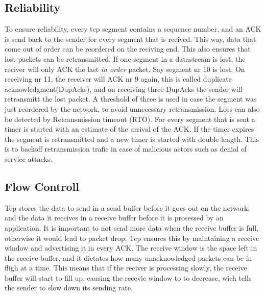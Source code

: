 \subsection{Reliability}
To ensure reliability, every tcp segment contains a sequence number, and an ACK is send back to the 
sender for every segment that is recived. This way, data that come out of order can be reordered on the 
reciving end. This also ensures that lost packets can be retransmitted. If one segment in a datastream is
lost, the reciver will only ACK the last \textit{in order} packet. Say segment nr 10 is lost. On receiving nr 11, the receiver
will ACK nr 9 again, this is called duplicate acknowledgment(DupAcks), and on receiving three DupAcks the sender will 
retransmitt the lost packet. A threshold of three is used in case the segment was just reordered by the network, to
avoid unnecessary retransmission.
Loss can also be detected by Retransmission timeout (RTO). For every segment that is sent a timer is started with 
an estimate of the arrival of the ACK. If the timer expires the segment is retransmitted and a new timer is started
with double length. This is to backoff retransmission trafic in case of malicious actors such as denial of service
attacks.

\subsection{Flow Controll}
Tcp stores the data to send in a send buffer before it goes out on the network, and the data it receives in a 
receive buffer before it is prosessed by an application. It is important to not send more data when the receive 
buffer is full, otherwise it would lead to packet drop. Tcp ensures this by maintaining a receive window and 
advertising it in every ACK. The receive window is the space left in the receive buffer, and it dictates how many 
unacknowledged packets can be in fligh at a time. This means that if the reciver is processing slowly, the receive 
buffer will start to fill up, causing the recevie window to to decrease, wich tells the sender to slow down
its sending rate.


